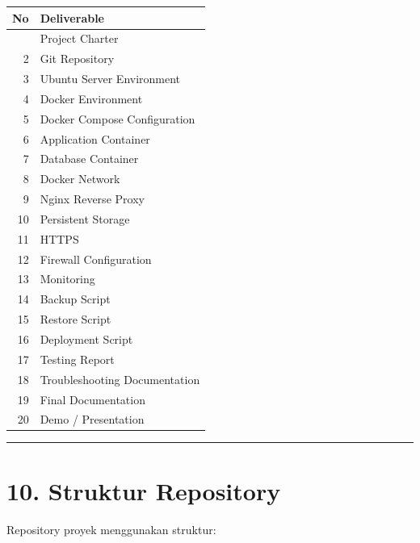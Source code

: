 \documentclass[
]{article}
\begin{document}
\begin{longtable}[]{@{}rl@{}}
\toprule\noalign{}
No & Deliverable \\
\midrule\noalign{}
\endhead
\bottomrule\noalign{}
\endlastfoot
1 & Project Charter \\
2 & Git Repository \\
3 & Ubuntu Server Environment \\
4 & Docker Environment \\
5 & Docker Compose Configuration \\
6 & Application Container \\
7 & Database Container \\
8 & Docker Network \\
9 & Nginx Reverse Proxy \\
10 & Persistent Storage \\
11 & HTTPS \\
12 & Firewall Configuration \\
13 & Monitoring \\
14 & Backup Script \\
15 & Restore Script \\
16 & Deployment Script \\
17 & Testing Report \\
18 & Troubleshooting Documentation \\
19 & Final Documentation \\
20 & Demo / Presentation \\
\end{longtable}

\begin{center}\rule{0.5\linewidth}{0.5pt}\end{center}

\section{10. Struktur Repository}\label{struktur-repository}

Repository proyek menggunakan struktur:
\end{document}
